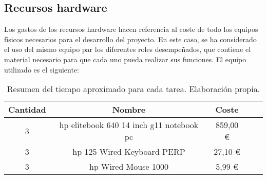 \subsection{Recursos hardware}
Los gastos de los recursos hardware hacen referencia al coste de todo los equipos físicos necesarios para el desarrollo del proyecto.
En este caso, se ha considerado el uso del mismo equipo par los diferentes roles desempeñados, que contiene el material 
necesario para que cada uno pueda realizar sus funciones. El equipo utilizado es el siguiente:

\begin{table}[H]
    \centering
    \begin{tabular}{|c|c|c|c|c|}
        \hline
        \textbf{Cantidad} & \textbf{Nombre} & \textbf{Coste}\\
        \hline
        3 & hp elitebook 640 14 inch g11 notebook pc & 859,00 € \\
        3 & hp 125 Wired Keyboard PERP & 27,10 € \\
        3 & hp Wired Mouse 1000 & 5,99 € \\
        \hline
    \end{tabular}
    \caption{Resumen del tiempo aproximado para cada tarea. Elaboración propia.}
    \label{tab:estimaciones}
\end{table}
